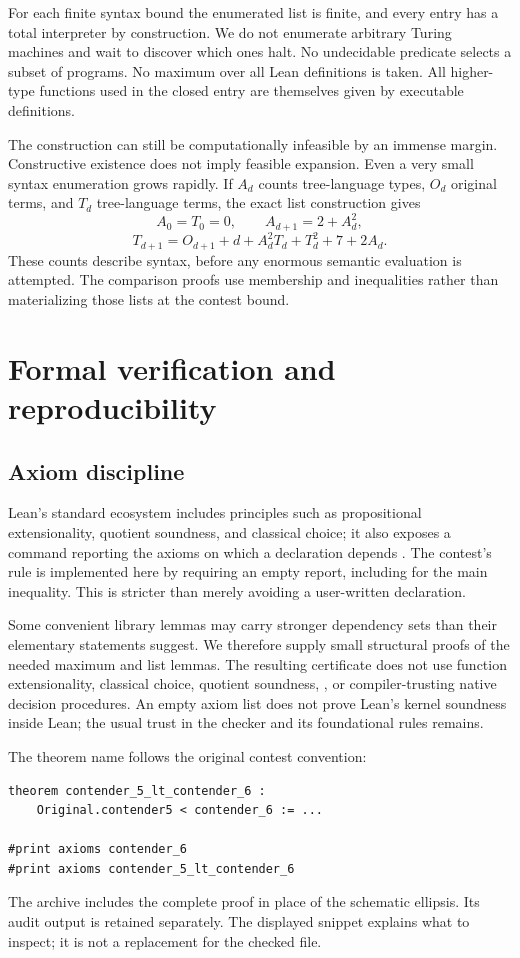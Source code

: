 \documentclass[11pt,a4paper]{article}
\theoremstyle{definition}
\newcommand{\code}[1]{\texttt{\detokenize{#1}}}
\begin{document}
For each finite syntax bound the enumerated list is finite, and every entry
has a total interpreter by construction. We do not enumerate arbitrary
Turing machines and wait to discover which ones halt. No undecidable
predicate selects a subset of programs. No maximum over all Lean definitions
is taken. All higher-type functions used in the closed entry are themselves
given by executable definitions.

The construction can still be computationally infeasible by an immense
margin. Constructive existence does not imply feasible expansion. Even a
very small syntax enumeration grows rapidly. If \(A_d\) counts tree-language
types, \(O_d\) original terms, and \(T_d\) tree-language terms, the exact list
construction gives
\[
 A_0=T_0=0,\qquad A_{d+1}=2+A_d^2,
\]
\[
 T_{d+1}=O_{d+1}+d+A_d^2T_d+T_d^2+7+2A_d.
\]
These counts describe syntax, before any enormous semantic evaluation is
attempted. The comparison proofs use membership and inequalities rather
than materializing those lists at the contest bound.

\section{Formal verification and reproducibility}
\label{sec:verification}

\subsection{Axiom discipline}

Lean's standard ecosystem includes principles such as propositional
extensionality, quotient soundness, and classical choice; it also exposes a
command reporting the axioms on which a declaration depends
\cite{leanaxioms}. The contest's rule is implemented here by requiring an
empty report, including for the main inequality. This is stricter than
merely avoiding a user-written \code{axiom} declaration.

Some convenient library lemmas may carry stronger dependency sets than their
elementary statements suggest. We therefore supply small structural proofs
of the needed maximum and list lemmas. The resulting certificate does not
use function extensionality, classical choice, quotient soundness,
\code{sorryAx}, or compiler-trusting native decision procedures. An empty
axiom list does not prove Lean's kernel soundness inside Lean; the usual
trust in the checker and its foundational rules remains.

The theorem name follows the original contest convention:
\begin{lstlisting}
theorem contender_5_lt_contender_6 :
    Original.contender5 < contender_6 := ...

#print axioms contender_6
#print axioms contender_5_lt_contender_6
\end{lstlisting}
The archive includes the complete proof in place of the schematic ellipsis.
Its audit output is retained separately. The displayed snippet explains
what to inspect; it is not a replacement for the checked file.
\end{document}
